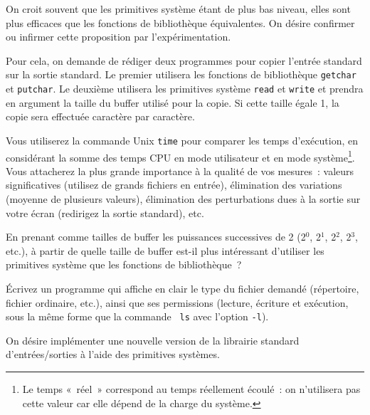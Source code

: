 \question

On croit souvent que les primitives système étant de plus bas niveau,
elles sont plus efficaces que les fonctions de bibliothèque
équivalentes. On désire confirmer ou infirmer cette proposition par
l'expérimentation.

Pour cela, on demande de rédiger deux programmes pour copier l'entrée
standard sur la sortie standard. Le premier utilisera les fonctions
de bibliothèque \texttt {getchar} et \texttt {putchar}.  Le deuxième
utilisera les primitives système \texttt {read} et \texttt {write}
et prendra en argument la taille du buffer utilisé pour la copie.
Si cette taille égale 1, la copie sera effectuée caractère par
caractère.

Vous utiliserez la commande Unix \texttt {time} pour comparer les temps
d'exécution, en considérant la somme des temps CPU en mode utilisateur
et en mode système\footnote {Le temps «~réel~» correspond au temps
réellement écoulé~: on n'utilisera pas cette valeur car elle dépend
de la charge du système.}.  Vous attacherez la plus grande importance à
la qualité de vos mesures~: valeurs significatives (utilisez de grands
fichiers en entrée), élimination des variations (moyenne de plusieurs
valeurs), élimination des perturbations dues à la sortie sur votre
écran (redirigez la sortie standard), etc.

En prenant comme tailles de buffer les puissances successives de 2
(2$^0$, 2$^1$, 2$^2$, 2$^3$, etc.), à partir de quelle taille de
buffer est-il plus intéressant d'utiliser les primitives système
que les fonctions de bibliothèque~?


\question

Écrivez un programme qui affiche en clair le type du fichier demandé
(répertoire, fichier ordinaire, etc.), ainsi que ses permissions
(lecture, écriture et exécution, sous la même forme que la commande {\tt
ls} avec l'option {\tt -l}).


\question

On désire implémenter une nouvelle version de la librairie standard
d'entrées/sorties à l'aide des primitives systèmes.

